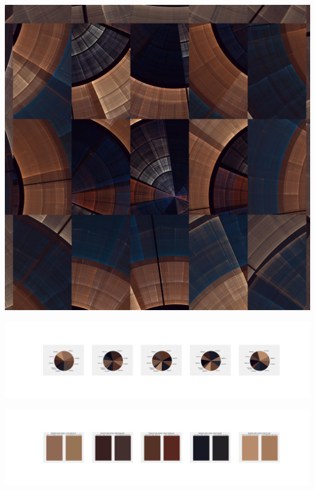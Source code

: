 \documentclass[11pt]{article}
\begin{document}
\begin{landscape}
    \begin{center}
    \includegraphics[width=\textwidth]{./nbimg/file (255).jpg}
    \end{center}

    \begin{center}
    \includegraphics[width=250mm]{./nbimg/pie-173.jpg}
    \end{center}

    \begin{center}
    \includegraphics[width=250mm]{./nbimg/peak-173.jpg}
    \end{center}
    


\end{landscape}
\end{document}
